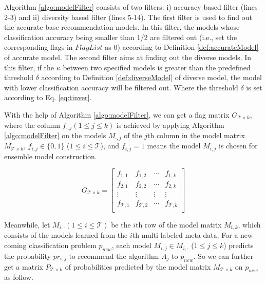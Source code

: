 \documentclass[acmsmall]{acmart}
\begin{document}
Algorithm \ref{algo:modelFilter} consists of two filters: i)
accuracy based filter (lines 2-3) and ii) diversity based filter
(lines 5-14). The first filter is used to find out the accurate base
recommendation models. In this filter, the models whose
classification accuracy being smaller than 1/2 are filtered out
(i.e., set the corresponding flags in $FlagList$ as 0) according to
Definition \ref{def:accurateModel} of accurate model. The second
filter aims at finding out the diverse models. In this filter, if
the $\kappa$ between two specified models is greater than the
predefined threshold $\delta$ according to Definition
\ref{def:diverseModel} of diverse model, the model with lower
classification accuracy will be filtered out. Where the threshold
$\delta$ is set according to Eq. \ref{eq:tinver}.

With the help of Algorithm \ref{algo:modelFilter}, we can get a flag
matrix $G_{\mathcal{T}\times k}$, where the column $f_{\cdot,j} (1\leq j\leq
k)$ is achieved by applying Algorithm \ref{algo:modelFilter} on the
models $M_{\cdot, j}$ of the $j$th column in the model matrix
$M_{\mathcal{T}\times k}$, $f_{i,j} \in \{0,1\}$ ($1\leq i\leq \mathcal{T}$), and
$f_{i,j} = 1$ means the model $M_{i,j}$ is chosen for ensemble model
construction.

\begin{equation}
G_{\mathcal{T}\times k} =\left[
\begin{array}{cccc}
f_{1,1} & f_{1,2} & \cdots & f_{1,k} \\
f_{2,1} & f_{2,2} & \cdots & f_{2,k} \\
\vdots & \vdots &  \vdots & \vdots \\
f_{\mathcal{T},1} & f_{\mathcal{T},2} & \cdots & f_{\mathcal{T},k} \\
\end{array}
\right]
\end{equation}

Meanwhile, let $M_{i,\cdot} (1\leq i\leq \mathcal{T})$ be the $i$th row of the
model matrix $M_{t,k}$, which consists of the models learned from
the $i$th multi-labeled meta-data. For a new coming classification
problem $p_{new}$, each model $M_{i,j} \in M_{i,\cdot}$ ($1\leq
j\leq k$) predicts the probability $pr_{i,j}$ to recommend the
algorithm $A_j$ to $p_{new}$. So we can further get a matrix
$P_{\mathcal{T}\times k}$ of probabilities predicted by the model matrix
$M_{\mathcal{T}\times k}$ on $p_{new}$ as follow.
\end{document}
